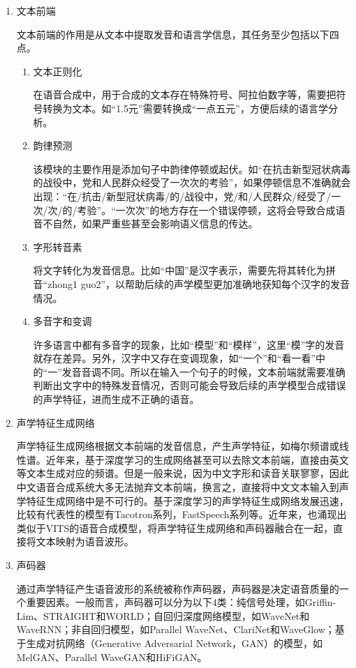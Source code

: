 \documentclass[cn,10pt,math=newtx,citestyle=gb7714-2015,bibstyle=gb7714-2015]{elegantbook}
\begin{document}
\begin{enumerate}
  \item 文本前端
  
  文本前端的作用是从文本中提取发音和语言学信息，其任务至少包括以下四点。
  
  \begin{enumerate}
    \item 文本正则化
    
    在语音合成中，用于合成的文本存在特殊符号、阿拉伯数字等，需要把符号转换为文本。如“1.5元”需要转换成“一点五元”，方便后续的语言学分析。

    \item 韵律预测
    
    该模块的主要作用是添加句子中韵律停顿或起伏。如“在抗击新型冠状病毒的战役中，党和人民群众经受了一次次的考验”，如果停顿信息不准确就会出现：“在/抗击/新型冠状病毒/的/战役中，党/和/人民群众/经受了/一次/次/的/考验”。“一次次”的地方存在一个错误停顿，这将会导致合成语音不自然，如果严重些甚至会影响语义信息的传达。

    \item 字形转音素
    
    将文字转化为发音信息。比如“中国”是汉字表示，需要先将其转化为拼音“zhong1 guo2”，以帮助后续的声学模型更加准确地获知每个汉字的发音情况。

    \item 多音字和变调
    
    许多语言中都有多音字的现象，比如“模型”和“模样”，这里“模”字的发音就存在差异。另外，汉字中又存在变调现象，如“一个”和“看一看”中的“一”发音音调不同。所以在输入一个句子的时候，文本前端就需要准确判断出文字中的特殊发音情况，否则可能会导致后续的声学模型合成错误的声学特征，进而生成不正确的语音。
  \end{enumerate}

  \item 声学特征生成网络
  
  声学特征生成网络根据文本前端的发音信息，产生声学特征，如梅尔频谱或线性谱。近年来，基于深度学习的生成网络甚至可以去除文本前端，直接由英文等文本生成对应的频谱。但是一般来说，因为中文字形和读音关联寥寥，因此中文语音合成系统大多无法抛弃文本前端，换言之，直接将中文文本输入到声学特征生成网络中是不可行的。基于深度学习的声学特征生成网络发展迅速，比较有代表性的模型有Tacotron系列，FastSpeech系列等。近年来，也涌现出类似于VITS的语音合成模型，将声学特征生成网络和声码器融合在一起，直接将文本映射为语音波形。

  \item 声码器
  
  通过声学特征产生语音波形的系统被称作声码器，声码器是决定语音质量的一个重要因素。一般而言，声码器可以分为以下4类：纯信号处理，如Griffin-Lim、STRAIGHT和WORLD；自回归深度网络模型，如WaveNet和WaveRNN；非自回归模型，如Parallel WaveNet、ClariNet和WaveGlow；基于生成对抗网络（Generative Adversarial Network，GAN）的模型，如MelGAN、Parallel WaveGAN和HiFiGAN。

\end{enumerate}
\end{document}
